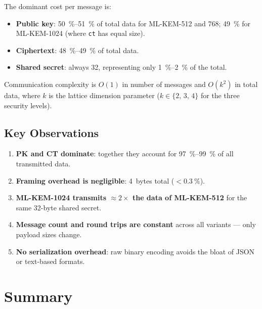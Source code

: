 \documentclass[a4paper,11pt]{article}
\begin{document}
The dominant cost per message is:
\begin{itemize}
  \item \textbf{Public key}: \SI{50}{\percent}--\SI{51}{\percent} of total
        data for ML-KEM-512 and 768; \SI{49}{\percent} for ML-KEM-1024
        (where \texttt{ct} has equal size).
  \item \textbf{Ciphertext}: \SI{48}{\percent}--\SI{49}{\percent} of total
        data.
  \item \textbf{Shared secret}: always \SI{32}{\byte}, representing only
        \SI{1}{\percent}--\SI{2}{\percent} of the total.
\end{itemize}

Communication complexity is $O(1)$ in number of messages and $O(k^2)$ in
total data, where $k$ is the lattice dimension parameter
($k \in \{2,\,3,\,4\}$ for the three security levels).

\subsection{Key Observations}

\begin{enumerate}
  \item \textbf{PK and CT dominate}: together they account for
        \SI{97}{\percent}--\SI{99}{\percent} of all transmitted data.
  \item \textbf{Framing overhead is negligible}: 4~bytes total
        ($< \SI{0.3}{\percent}$).
  \item \textbf{ML-KEM-1024 transmits ${\approx}2\times$ the data of
        ML-KEM-512} for the same 32-byte shared secret.
  \item \textbf{Message count and round trips are constant} across all
        variants — only payload sizes change.
  \item \textbf{No serialization overhead}: raw binary encoding avoids the
        bloat of JSON or text-based formats.
\end{enumerate}

\section{Summary}
\end{document}

